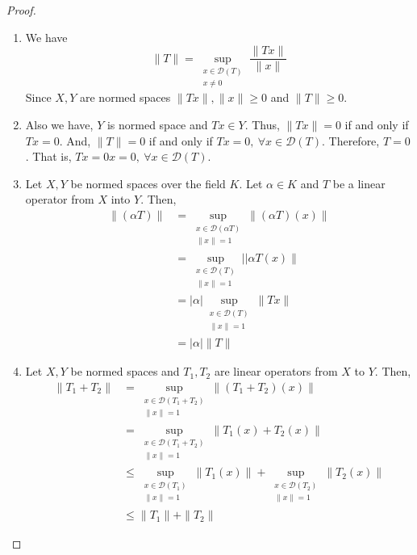 \begin{proof}
	\begin{enumerate}
		\item We have 
			\[ \|T\| = \sup_{\substack{x \in \mathscr{D}(T) \\ x \ne 0}} \frac{\|Tx\|}{\|x\|} \]
			Since $X,Y$ are normed spaces $\|Tx\|, \|x\| \ge 0$ and $\|T\| \ge 0$.
		\item
			Also we have, $Y$ is normed space and $Tx \in Y$.
			Thus, $\|Tx\| = 0$ if and only if $Tx = 0$.
			And, $\| T \| = 0$ if and only if $Tx = 0,\ \forall x \in \mathscr{D}(T)$.
			Therefore, $T = 0$.
			That is, $Tx = 0x = 0,\ \forall x \in \mathscr{D}(T)$.
		\item 
			Let $X,Y$ be normed spaces over the field $K$.
			Let $\alpha \in K$ and $T$ be a linear operator from $X$ into $Y$.
			Then,
		\begin{align*}
			\| (\alpha T) \|
			& = \sup_{\substack{x \in \mathscr{D}(\alpha T)\\ \|x\| = 1}} \|(\alpha T)(x)\| \\
			& = \sup_{\substack{x \in \mathscr{D}(T)\\ \| x \| = 1}} || \alpha T(x) \| \\
			& = |\alpha| \sup_{\substack{x \in \mathscr{D}(T) \\ \|x\| = 1}} \| Tx \| \\
			& = |\alpha| \|T\|
		\end{align*}
		\item 
			Let $X,Y$ be normed spaces and $T_1,T_2$ are linear operators from $X$ to $Y$.
			Then,
		\begin{align*}
			\| T_1+T_2 \| 
			& = \sup_{\substack{x \in \mathscr{D}(T_1+T_2) \\ \|x\|=1}} \|(T_1+T_2)(x)\| \\
			& = \sup_{\substack{x \in \mathscr{D}(T_1+T_2) \\ \|x\|=1}} \|T_1(x) + T_2(x)\| \\
			& \le \sup_{\substack{x \in \mathscr{D}(T_1)\\ \|x\|=1}} \|T_1(x)\| + \sup_{\substack{x \in\mathscr{D}(T_2)\\ \|x\|=1}} \|T_2(x)\| \\
			& \le \|T_1\| + \|T_2\|
		\end{align*}

	\end{enumerate}
\end{proof}


